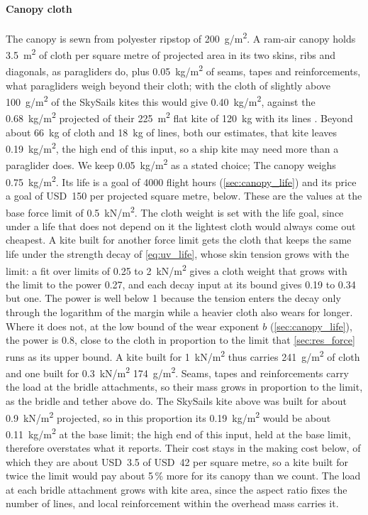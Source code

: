 \paragraph{Canopy cloth} The canopy is sewn from polyester ripstop of \SI{200}{g/m^2}. A ram-air canopy holds \SI{3.5}{m^2} of cloth per square metre of projected area in its two skins, ribs and diagonals, as paragliders do, plus \SI{0.05}{kg/m^2} of seams, tapes and reinforcements, what paragliders weigh beyond their cloth; with the cloth of slightly above \SI{100}{g/m^2} of the SkySails kites this would give \SI{0.40}{kg/m^2}, against the \SI{0.68}{kg/m^2} projected of their \SI{225}{m^2} flat kite of \SI{120}{kg} with its lines \citep{paulig2013}. Beyond about \SI{66}{kg} of cloth and \SI{18}{kg} of lines, both our estimates, that kite leaves \SI{0.19}{kg/m^2}, the high end of this input, so a ship kite may need more than a paraglider does. We keep \SI{0.05}{kg/m^2} as a stated choice;  The canopy weighs \SI{0.75}{kg/m^2}. Its life is a goal of \num{4000} flight hours (\cref{sec:canopy_life}) and its price a goal of USD~150 per projected square metre, below. These are the values at the base force limit of \SI{0.5}{kN/m^2}. The cloth weight is set with the life goal, since under a life that does not depend on it the lightest cloth would always come out cheapest. A kite built for another force limit gets the cloth that keeps the same life under the strength decay of \cref{eq:uv_life}, whose skin tension grows with the limit: a fit over limits of 0.25 to \SI{2}{kN/m^2} gives a cloth weight that grows with the limit to the power 0.27, and each decay input at its bound gives 0.19 to 0.34 but one. The power is well below 1 because the tension enters the decay only through the logarithm of the margin while a heavier cloth also wears for longer. Where it does not, at the low bound of the wear exponent $b$ (\cref{sec:canopy_life}), the power is 0.8, close to the cloth in proportion to the limit that \cref{sec:res_force} runs as its upper bound. A kite built for \SI{1}{kN/m^2} thus carries \SI{241}{g/m^2} of cloth and one built for \SI{0.3}{kN/m^2} \SI{174}{g/m^2}. Seams, tapes and reinforcements carry the load at the bridle attachments, so their mass grows in proportion to the limit, as the bridle and tether above do. The SkySails kite above was built for about \SI{0.9}{kN/m^2} projected, so in this proportion its \SI{0.19}{kg/m^2} would be about \SI{0.11}{kg/m^2} at the base limit; the high end of this input, held at the base limit, therefore overstates what it reports. Their cost stays in the making cost below, of which they are about USD~3.5 of USD~42 per square metre, so a kite built for twice the limit would pay about 5\,\% more for its canopy than we count. The load at each bridle attachment grows with kite area, since the aspect ratio fixes the number of lines, and local reinforcement within the overhead mass carries it.

